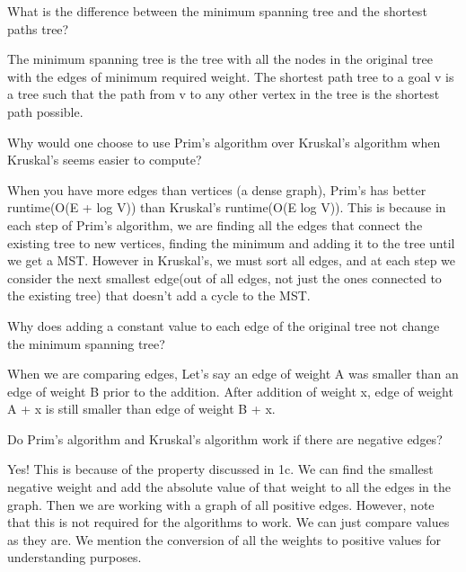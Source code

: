 \question  What is the difference between the minimum spanning tree and the shortest paths tree?

\begin{solution}[0.5in]
The minimum spanning tree is the tree with all the nodes in the original tree with the edges of minimum required weight. The shortest path tree to a goal v is a tree such that the path from v to any other vertex in the tree is the shortest path possible. 
\end{solution}

\question Why would one choose to use Prim’s algorithm over Kruskal’s algorithm when Kruskal’s seems easier to compute?
\begin{solution}[0.75in]
When you have more edges than vertices (a dense graph), Prim’s has better runtime(O(E + log V)) than Kruskal’s runtime(O(E log V)). This is because in each step of Prim’s algorithm, we are finding all the edges that connect the existing tree to new vertices, finding the minimum and adding it to the tree until we get a MST. However in Kruskal’s, we must sort all edges, and at each step we consider the next smallest edge(out of all edges, not just the ones connected to the existing tree) that doesn’t add a cycle to the MST. 

\end{solution}

\question Why does adding a constant value to each edge of the original tree not change the minimum spanning tree?
\begin{solution}[0.75in]
When we are comparing edges, Let’s say an edge of weight  A was smaller than an edge of weight B prior to the addition. After addition of weight x, edge of weight A + x is still smaller than edge of weight B + x. 
\end{solution}

\question Do Prim’s algorithm and Kruskal’s algorithm work if there are negative edges?
\begin{solution}[0.75in]
Yes! This is because of the property discussed in 1c. We can find the smallest negative weight and add the absolute value of that weight to all the edges in the graph. Then we are working with a graph of all positive edges. However, note that this is not required for the algorithms to work. We can just compare values as they are. We mention the conversion of all the weights to positive values for understanding purposes. 
\end{solution}